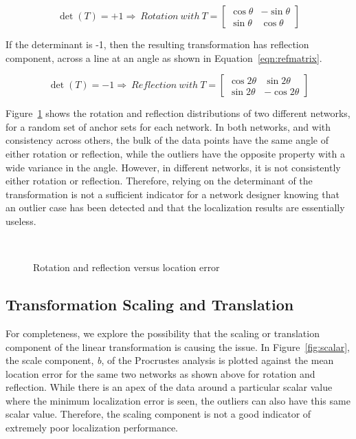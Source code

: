 \begin{equation}
	\det{(T)}=+1 \Rightarrow ~Rotation ~with ~T=
	\begin{bmatrix}
	\cos{\theta} & -\sin{\theta} \\ 
	\sin{\theta} & \cos{\theta}\end{bmatrix}
	\label{eqn:rotmatrix} 
\end{equation}

If the determinant is -1, then the resulting transformation has reflection component, across a line at an angle as shown in Equation~\ref{eqn:refmatrix}. 

\begin{equation}
	\det{(T)}=-1 \Rightarrow ~Reflection ~with ~T=
	\begin{bmatrix}
	\cos{2{\theta}} & \sin{2{\theta}} \\ 
	\sin{2{\theta}} & -\cos{2{\theta}}\end{bmatrix}
	\label{eqn:refmatrix} 
\end{equation}

Figure~\ref{fig:rotref} shows the rotation and reflection distributions of two different networks, for a random set of anchor sets for each network.  In both networks, and with consistency across others, the bulk of the data points have the same angle of either rotation or reflection, while the outliers have the opposite property with a wide variance in the angle.  However, in different networks, it is not consistently either rotation or reflection.  Therefore, relying on the determinant of the transformation is not a sufficient indicator for a network designer knowing that an outlier case has been detected and that the localization results are essentially useless.

\begin{figure}
  \centering
\\
	\caption{Rotation and reflection versus location error}	
	\label{fig:rotref}
\end{figure}

\subsection{Transformation Scaling and Translation}

For completeness, we explore the possibility that the scaling or translation component of the linear transformation is causing the issue.  In Figure~\ref{fig:scalar}, the scale component, \emph{b}, of the Procrustes analysis is plotted against the mean location error for the same two networks as shown above for rotation and reflection.  While there is an apex of the data around a particular scalar value where the minimum localization error is seen, the outliers can also have this same scalar value.  Therefore, the scaling component is not a good indicator of  extremely poor localization performance.

